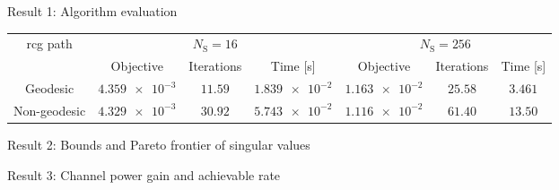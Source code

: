 \documentclass[final,xcolor={table}]{beamer}
\DeclareMathOperator{\rank}{rank}
\newlength{\sepwidth}
\newlength{\colwidth}
\newcommand{\separatorcolumn}{\begin{column}{\sepwidth}\end{column}}
\begin{document}
\begin{frame}[t]
\begin{columns}[t]
\begin{column}{\colwidth}
			\begin{exampleblock}{Result 1: Algorithm evaluation}
				\begin{table}[!t]
					\centering
					\begin{tabular}{ccccccc}
						\toprule
						\multirow{2}{*}{\gls{rcg} path} & \multicolumn{3}{c}{$N_\mathrm{S}=16$} & \multicolumn{3}{c}{$N_\mathrm{S}=256$}                                                                     \\ \cmidrule(lr){2-4} \cmidrule(lr){5-7}
														& Objective                             & Iterations                               & Time [s]         & Objective        & Iterations   & Time [s]   \\ \midrule
						Geodesic                        & $\num{4.359e-3}$                      & $11.59$                                  & $\num{1.839e-2}$ & $\num{1.163e-2}$ & $25.58$      & $3.461$    \\
						Non-geodesic                    & $\num{4.329e-3}$                      & $30.92$                                  & $\num{5.743e-2}$ & $\num{1.116e-2}$ & $61.40$      & $13.50$    \\ \bottomrule
					\end{tabular}
				\end{table}
			\end{exampleblock}

			\begin{exampleblock}{Result 2: Bounds and Pareto frontier of singular values}
				\begin{figure}[!t]
					\centering
					\subfloat[Analytical vs numerical results: $4 \times 128 \times 4, \rank(\mathbf{H}_\mathrm{F}) = 2$]{
						\resizebox{0.492\linewidth}{!}{
							
						}
					}
				\end{figure}
			\end{exampleblock}

			\begin{exampleblock}{Result 3: Channel power gain and achievable rate}
				\begin{figure}[!t]
					\centering
				\end{figure}

			\end{exampleblock}
		\end{column}

		\separatorcolumn
	\end{columns}
\end{frame}
\end{document}
